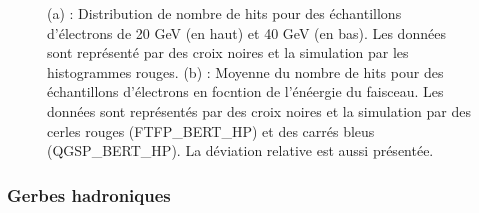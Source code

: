 \begin{figure}[!ht]
\begin{minipage}{.6\textwidth}
  \end{minipage}
  \caption{(a) : Distribution de nombre de hits pour des échantillons d'électrons de 20 GeV (en haut) et 40 GeV (en bas). Les données sont représenté par des croix noires et la simulation par les histogrammes rouges. (b) : Moyenne du nombre de hits pour des échantillons d'électrons en focntion de l'énéergie du faisceau. Les données sont représentés par des croix noires et la simulation par des cerles rouges (FTFP\_BERT\_HP) et des carrés bleus (QGSP\_BERT\_HP). La déviation relative est aussi présentée.}
  \label{fig.nhite-}
\end{figure}


\subsubsection{Gerbes hadroniques}

